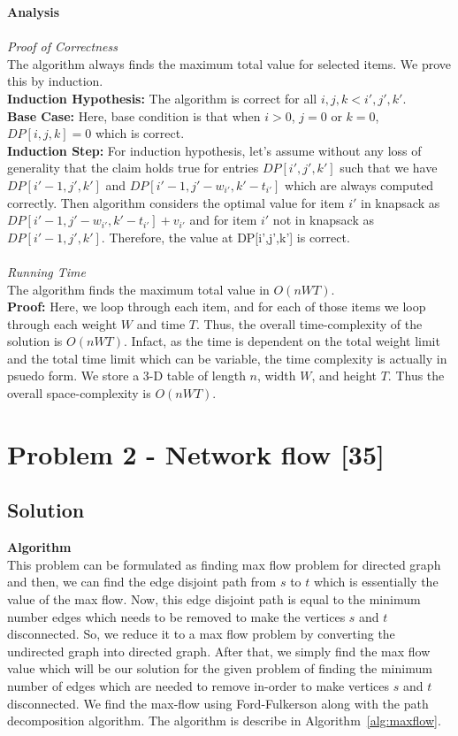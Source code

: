 \documentclass{article}
\begin{document}
\textbf{Analysis}\\\\
\textit{Proof of Correctness}\\
The algorithm always finds the maximum total value for selected items. We prove this by induction.\\
\textbf{Induction Hypothesis:} The algorithm is correct for all $i, j, k < i', j', k'$.\\
\textbf{Base Case:} Here, base condition is that when $i>0$, $j=0$ or $k=0$, $DP[i,j,k] = 0$ which is correct. \\
\textbf{Induction Step:} For induction hypothesis, let's assume without any loss of generality that the claim holds true for entries $DP[i', j', k']$ such that we have $DP[i'-1, j', k']$ and $DP[i'-1, j'-w_{i'}, k'-t_{i'}]$ which are always computed correctly. Then algorithm considers the optimal value for item $i'$ in knapsack as $DP[i'-1, j'-w_{i'}, k'-t_{i'}]+v_{i'}$ and for item $i'$ not in knapsack as $DP[i'-1, j',k']$. Therefore, the value at DP[i',j',k'] is correct.\\\\
\textit{Running Time}\\ The algorithm finds the maximum total value in $O(nWT)$.\\
\textbf{Proof:} Here, we loop through each item, and for each of those items we loop through each weight $W$ and time $T$. Thus, the overall time-complexity of the solution is $O(nWT)$. Infact, as the time is dependent on the total weight limit and the total time limit which can be variable, the time complexity is actually in psuedo form. We store a 3-D table of length $n$, width $W$, and height $T$. Thus the overall space-complexity is $O(nWT)$.\\
\clearpage
\section*{Problem 2 - Network flow [35]}
\subsection*{Solution}
\textbf{Algorithm}\\
This problem can be formulated as finding max flow problem for directed graph and then, we can find the edge disjoint path from $s$ to $t$ which is essentially the value of the max flow. Now, this edge disjoint path is equal to the minimum number edges which needs to be removed to make the vertices $s$ and $t$ disconnected. So, we reduce it to a max flow problem by converting the undirected graph into directed graph. After that, we simply find the max flow value which will be our solution for the given problem of finding the minimum number of edges which are needed to remove in-order to make vertices $s$ and $t$ disconnected. We find the max-flow using Ford-Fulkerson along with the path decomposition algorithm. The algorithm is describe in Algorithm~\ref{alg:maxflow}.
\end{document}
